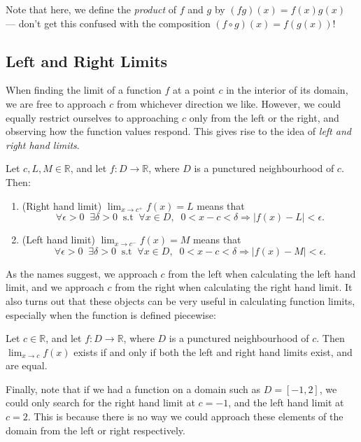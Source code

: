 \documentclass[
  10pt,
  a4paper]{article}
\providecommand{\tightlist}{%
  \setlength{\itemsep}{0pt}\setlength{\parskip}{0pt}}
\theoremstyle{plain}
\theoremstyle{definition}
\theoremstyle{plain}
\theoremstyle{plain}
\theoremstyle{plain}
\theoremstyle{plain}
\theoremstyle{definition}
\theoremstyle{definition}
\theoremstyle{remark}
\theoremstyle{remark}
\let\BeginKnitrBlock\begin \let\EndKnitrBlock\end
\begin{document}
Note that here, we define the \emph{product} of \(f\) and \(g\) by \((fg)(x) = f(x)g(x)\) --- don't get this confused with the composition \((f \circ g)(x) = f(g(x))\)!

\hypertarget{left-and-right-limits}{%
\subsection{Left and Right Limits}\label{left-and-right-limits}}

When finding the limit of a function \(f\) at a point \(c\) in the interior of its domain, we are free to approach \(c\) from whichever direction we like. However, we could equally restrict ourselves to approaching \(c\) only from the left or the right, and observing how the function values respond. This gives rise to the idea of \emph{left and right hand limits}.

\BeginKnitrBlock{definition}[Left and Right Hand Limits]
{\label{def:def1} }Let \(c, L, M \in \mathbb{R}\), and let \(f: D \to \mathbb{R}\), where \(D\) is a punctured neighbourhood of \(c\). Then:

\begin{enumerate}
\def\labelenumi{\arabic{enumi}.}
\tightlist
\item
  (Right hand limit) \(\lim_{x \to c^{+}}f(x) = L\) means that \[\forall \epsilon >0\;\;\exists \delta>0\;\;\text{s.t}\;\; \forall x \in D,\;\; 0 < x - c < \delta \Rightarrow \lvert f(x) - L \rvert < \epsilon.\]
\item
  (Left hand limit) \(\lim_{x \to c^{-}}f(x) = M\) means that \[\forall \epsilon >0\;\;\exists \delta>0\;\;\text{s.t}\;\; \forall x \in D,\;\; 0 < x - c < \delta \Rightarrow \lvert f(x) - M \rvert < \epsilon.\]
\end{enumerate}
\EndKnitrBlock{definition}

As the names suggest, we approach \(c\) from the left when calculating the left hand limit, and we approach \(c\) from the right when calculating the right hand limit. It also turns out that these objects can be very useful in calculating function limits, especially when the function is defined piecewise:

\BeginKnitrBlock{proposition}
{\label{prp:prop1} }Let \(c \in \mathbb{R}\), and let \(f: D \to \mathbb{R}\), where \(D\) is a punctured neighbourhood of \(c\). Then \(\lim_{x \to c}f(x)\) exists if and only if both the left and right hand limits exist, and are equal.
\EndKnitrBlock{proposition}

Finally, note that if we had a function on a domain such as \(D = [-1,2]\), we could only search for the right hand limit at \(c = -1\), and the left hand limit at \(c = 2\). This is because there is no way we could approach these elements of the domain from the left or right respectively.
\end{document}
